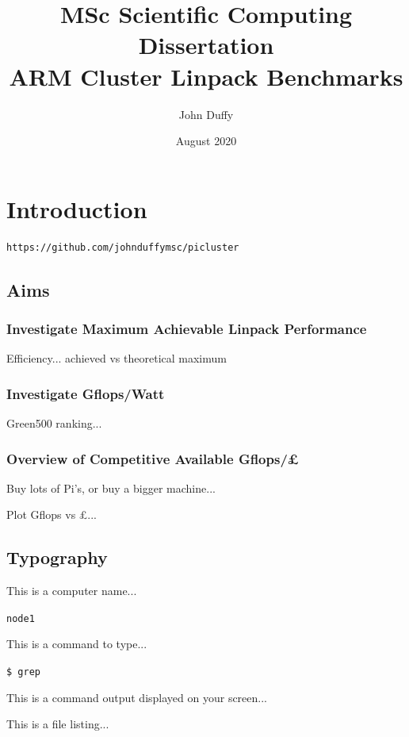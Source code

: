 \documentclass{article}
\title{MSc Scientific Computing Dissertation\\ARM Cluster Linpack Benchmarks}
\author{John Duffy}
\date{August 2020}
\begin{document}
\maketitle



\section{Introduction}

\begin{verbatim}
https://github.com/johnduffymsc/picluster
\end{verbatim}


\subsection{Aims}

\subsubsection{Investigate Maximum Achievable Linpack Performance}

Efficiency... achieved vs theoretical maximum


\subsubsection{Investigate Gflops/Watt}

Green500 ranking...


\subsubsection{Overview of Competitive Available Gflops/£}

Buy lots of Pi's, or buy a bigger machine...

Plot Gflops vs £...


\subsection{Typography}

This is a computer name...

\verb|node1|

This is a command to type...

\verb|$ grep|

This is a command output displayed on your screen...


This is a file listing...
\end{document}
